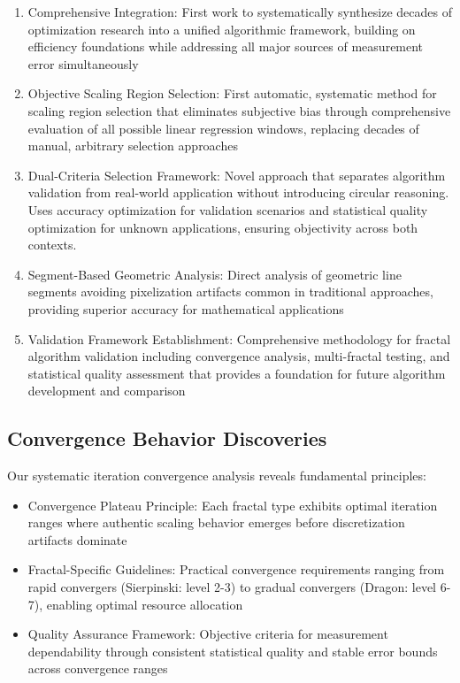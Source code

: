 \documentclass[preprint,12pt]{elsarticle}
\def\textbf#1{#1}%
\begin{document}
\begin{enumerate}
\item \textbf{Comprehensive Integration}: First work to systematically synthesize decades of optimization research into a unified algorithmic framework, building on efficiency foundations while addressing all major sources of measurement error simultaneously

\item \textbf{Objective Scaling Region Selection}: First automatic, systematic method for scaling region selection that eliminates subjective bias through comprehensive evaluation of all possible linear regression windows, replacing decades of manual, arbitrary selection approaches

\item \textbf{Dual-Criteria Selection Framework}: Novel approach that separates algorithm validation from real-world application without introducing circular reasoning. Uses accuracy optimization for validation scenarios and statistical quality optimization for unknown applications, ensuring objectivity across both contexts.

\item \textbf{Segment-Based Geometric Analysis}: Direct analysis of geometric line segments avoiding pixelization artifacts common in traditional approaches, providing superior accuracy for mathematical applications

\item \textbf{Validation Framework Establishment}: Comprehensive methodology for fractal algorithm validation including convergence analysis, multi-fractal testing, and statistical quality assessment that provides a foundation for future algorithm development and comparison
\end{enumerate}

\subsection{Convergence Behavior Discoveries}

Our systematic iteration convergence analysis reveals fundamental principles:

\begin{itemize}
\item \textbf{Convergence Plateau Principle}: Each fractal type exhibits optimal iteration ranges where authentic scaling behavior emerges before discretization artifacts dominate

\item \textbf{Fractal-Specific Guidelines}: Practical convergence requirements ranging from rapid convergers (Sierpinski: level 2-3) to gradual convergers (Dragon: level 6-7), enabling optimal resource allocation

\item \textbf{Quality Assurance Framework}: Objective criteria for measurement dependability through consistent statistical quality and stable error bounds across convergence ranges
\end{itemize}
\end{document}
